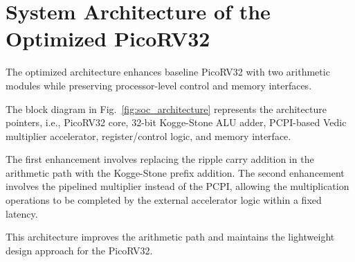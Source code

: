 \section{System Architecture of the Optimized PicoRV32}
\label{sec:architecture}

The optimized architecture enhances baseline PicoRV32 with two arithmetic modules while preserving processor-level control and memory interfaces.

The block diagram in Fig.~\ref{fig:soc_architecture} represents the architecture pointers, i.e., PicoRV32 core, 32-bit Kogge-Stone ALU adder, PCPI-based Vedic multiplier accelerator, register/control logic, and memory interface.



The first enhancement involves replacing the ripple carry addition in the arithmetic path with the Kogge-Stone prefix addition. The second enhancement involves the pipelined multiplier instead of the PCPI, allowing the multiplication operations to be completed by the external accelerator logic within a fixed latency.

This architecture improves the arithmetic path and maintains the lightweight design approach for the PicoRV32.
